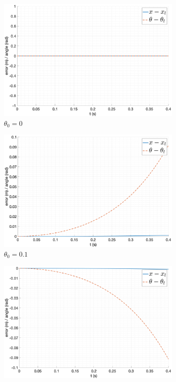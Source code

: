 \begin{figure}[ht!]
    \centering
    \begin{subfigure}[b]{0.45\textwidth}
        \includegraphics[width=\textwidth]{media/plots/free_motion/err_1.png}
        \caption{$\theta_0 = 0$}
  \end{subfigure}
    \begin{subfigure}[b]{0.45\textwidth}
        \includegraphics[width=\textwidth]{media/plots/free_motion/err_2.png}
        \caption{$\theta_0 = 0.1$}
    \end{subfigure}
    \begin{subfigure}[b]{0.45\textwidth}
        \includegraphics[width=\textwidth]{media/plots/free_motion/err_3.png}

\end{subfigure}
\end{figure}

